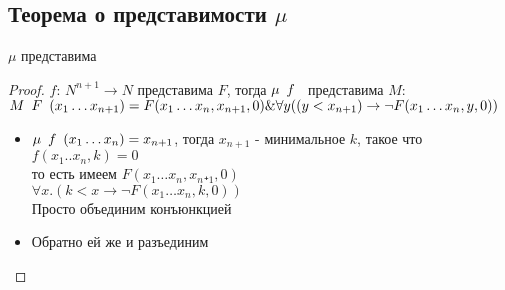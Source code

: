 \subsection{Теорема о представимости \texorpdfstring{$\mu$}{мю}}
\label{sec-11-7}
\begin{theorem}
$\mu$ представима
\end{theorem}
\begin{proof}
$f$: $N^{n+1} \to N $ представима $F$, тогда $\mu \template{f}$ представима $M$:\\
$M\template{F}(x_1 \dots x_{n+1}) = F(x_1 \dots x_n, x_{n+1}, 0) \& \forall y((y < x_{n+1}) \to \lnot F(x_1 \dots x_n, y, 0))$
\begin{itemize}
\item $\mu \template{f}(x_1 \dots x_n) = x_{n+1}$, тогда $x_{n+1}$ - минимальное $k$, такое что $f(x_1..x_n,k) = 0$\\
то есть имеем $F(x_1\dots x_n, x_n₊_1, 0)$\\
$\forall x.(k < x \to \lnot F(x_1 \dots x_n, k, 0))$\\
Просто объединим конъюнкцией
\item Обратно ей же и разъединим
\end{itemize}
\end{proof}

